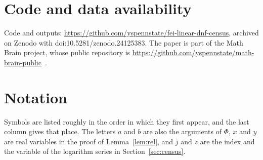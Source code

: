 \documentclass[11pt]{amsart}
\theoremstyle{remark}
\begin{document}
\section*{Code and data availability}
Code and outputs: \url{https://github.com/yspennstate/fei-linear-dnf-census}, archived on Zenodo with doi:10.5281/zenodo.24125383.
The paper is part of the Math Brain project, whose public repository is
\url{https://github.com/yspennstate/math-brain-public}~\cite{MathBrainRepo}.

\appendix
\section{Notation}\label{app:notation}

Symbols are listed roughly in the order in which they first appear, and the last column gives that place. The letters $a$ and $b$ are also the arguments of $\Phi$, $x$ and $y$ are real variables in the proof of Lemma~\ref{lem:rel}, and $j$ and $z$ are the index and the variable of the logarithm series in Section~\ref{sec:census}.
\end{document}
